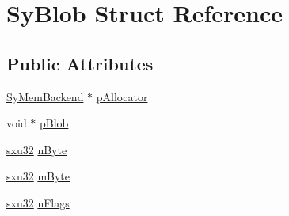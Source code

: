 \hypertarget{struct_sy_blob}{\section{Sy\-Blob Struct Reference}
\label{db/ddd/struct_sy_blob}
}
\subsection*{Public Attributes}
\begin{DoxyCompactItemize}
\item 
\hyperlink{struct_sy_mem_backend}{Sy\-Mem\-Backend} $\ast$ \hyperlink{struct_sy_blob_a8e555bac66544a516dbb0db474212bb8}{p\-Allocator}
\item 
void $\ast$ \hyperlink{struct_sy_blob_a2ca433ab8d862b22e0d7b0d905b1cb03}{p\-Blob}
\item 
\hyperlink{unqlite_8c_abc5a8a3f345c200c98c485551f49666e}{sxu32} \hyperlink{struct_sy_blob_a832e445f58f5869ec137d43ca5cc7933}{n\-Byte}
\item 
\hyperlink{unqlite_8c_abc5a8a3f345c200c98c485551f49666e}{sxu32} \hyperlink{struct_sy_blob_af36d6cce43a9616c99100ee055808405}{m\-Byte}
\item 
\hyperlink{unqlite_8c_abc5a8a3f345c200c98c485551f49666e}{sxu32} \hyperlink{struct_sy_blob_a021fe903f77cc88a30bec3022a5e700a}{n\-Flags}
\end{DoxyCompactItemize}


